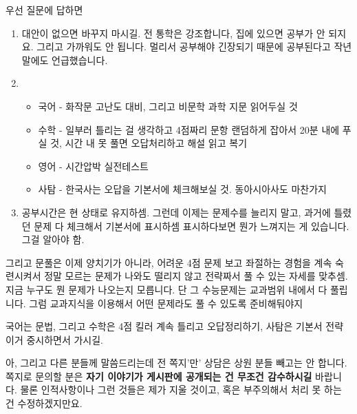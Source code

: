 우선 질문에 답하면
\vspace{5mm}

\begin{enumerate}

    \item 대안이 없으면 바꾸지 마시길. 전 통학은 강조합니다,
    집에 있으면 공부가 안 되지요. 그리고 가까워도 안 됩니다. 멀리서 공부해야 긴장되기 때문에 공부된다고 작년 말에도 언급했습니다.
    \vspace{5mm}
    
    \item 
    \begin{itemize}
        \item 국어 - 화작문 고난도 대비, 그리고 비문학 과학 지문 읽어두실 것
        \item 수학 - 일부러 틀리는 걸 생각하고 4점짜리 문항 랜덤하게 잡아서 20분 내에 푸실 것, 시간 내 못 풀면 오답처리하고 해설 읽고 복기
        \item 영어 - 시간압박 실전테스트
        \item 사탐 - 한국사는 오답을 기본서에 체크해보실 것. 동아시아사도 마찬가지
    \end{itemize}
    \vspace{5mm}
    
    \item 
    공부시간은 현 상태로 유지하셈.
    그런데 이제는 문제수를 늘리지 말고, 과거에 틀렸던 문제 다 체크해서 기본서에 표시하셈
    표시하다보면 뭔가 느껴지는 게 있습니다. 그걸 알아야 함.
    \vspace{5mm}
\end{enumerate}

그리고 문풀은 이제 양치기가 아니라, 어려운 4점 문제 보고 좌절하는 경험을 계속 숙련시켜서
정말 모르는 문제가 나와도 떨리지 않고 전략짜서 풀 수 있는 자세를 맞추셈.
지금 누구도 뭔 문제가 나오는지 모릅니다. 단 그 수능문제는 교과범위 내에서 다 풀립니다.
그럼 교과지식을 이용해서 어떤 문제라도 풀 수 있도록 준비해둬야지
\vspace{5mm}

국어는 문법, 그리고 수학은 4점 킬러 계속 틀리고 오답정리하기, 사탐은 기본서 전략
이거 중시하면서 가시길.
\vspace{5mm}

아, 그리고 다른 분들께 말씀드리는데 전 쪽지'만' 상담은 상원 분들 빼고는 안 합니다.
쪽지로 문의할 분은 \textbf{자기 이야기가 게시판에 공개되는 건 무조건 감수하시길} 바랍니다.
물론 인적사항이나 그런 것들은 제가 지울 것이고, 혹은 부주의해서 처리 못 하는 건 수정하겠지만요.
\vspace{5mm}






